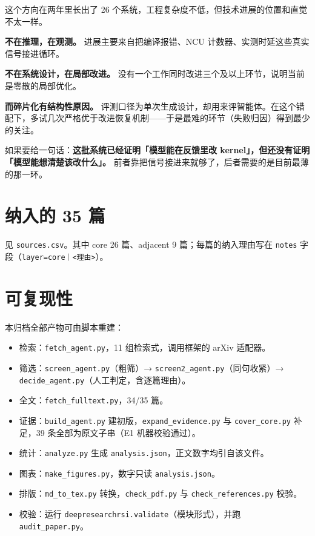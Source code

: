 这个方向在两年里长出了 26 个系统，工程复杂度不低，但技术进展的位置和直觉不太一样。

\textbf{不在推理，在观测。} 进展主要来自把编译报错、NCU 计数器、实测时延这些真实信号接进循环。

\textbf{不在系统设计，在局部改进。} 没有一个工作同时改进三个及以上环节，说明当前是零散的局部优化。

\textbf{而碎片化有结构性原因。} 评测口径为单次生成设计，却用来评智能体。在这个错配下，多试几次严格优于改进恢复机制——于是最难的环节（失败归因）得到最少的关注。

如果要给一句话：\textbf{这批系统已经证明「模型能在反馈里改 kernel」，但还没有证明「模型能想清楚该改什么」。} 前者靠把信号接进来就够了，后者需要的是目前最薄的那一环。

\appendix
\section{纳入的 35 篇}

见 \texttt{sources.csv}。其中 core 26 篇、adjacent 9 篇；每篇的纳入理由写在 \texttt{notes} 字段（\texttt{layer=core｜<理由>}）。

\section{可复现性}

本归档全部产物可由脚本重建：

\begin{itemize}
\item 检索：\texttt{fetch\_agent.py}，11 组检索式，调用框架的 arXiv 适配器。
\item 筛选：\texttt{screen\_agent.py}（粗筛）→ \texttt{screen2\_agent.py}（同句收紧）→ \texttt{decide\_agent.py}（人工判定，含逐篇理由）。
\item 全文：\texttt{fetch\_fulltext.py}，34/35 篇。
\item 证据：\texttt{build\_agent.py} 建初版，\texttt{expand\_evidence.py} 与 \texttt{cover\_core.py} 补足，39 条全部为原文子串（E1 机器校验通过）。
\item 统计：\texttt{analyze.py} 生成 \texttt{analysis.json}，正文数字均引自该文件。
\item 图表：\texttt{make\_figures.py}，数字只读 \texttt{analysis.json}。
\item 排版：\texttt{md\_to\_tex.py} 转换，\texttt{check\_pdf.py} 与 \texttt{check\_references.py} 校验。
\item 校验：运行 \texttt{deepresearchrsi.validate}（模块形式），并跑 \texttt{audit\_paper.py}。
\end{itemize}

